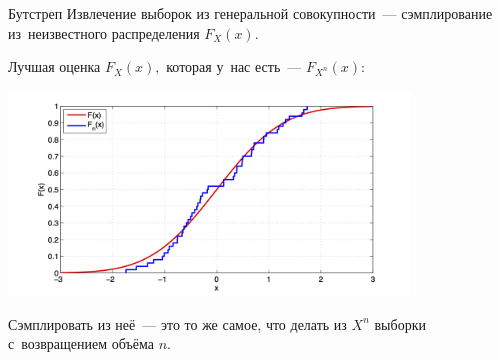 \documentclass[11pt,pdf,utf8,hyperref={unicode},aspectratio=169]{beamer}
\begin{document}
\begin{frame}{Бутстреп}
	Извлечение выборок из генеральной совокупности~--- сэмплирование из~неизвестного распределения $F_X\left(x\right).$

	Лучшая оценка $F_X\left(x\right),$ которая у~нас есть~--- $F_{X^n}\left(x\right)$:
	\begin{center}
		\includegraphics[width=0.8\textwidth]{ecdf.png}
	\end{center}
	Сэмплировать из неё~--- это то же самое, что делать из $X^n$ выборки с~возвращением объёма $n$.
\end{frame}
\end{document}
